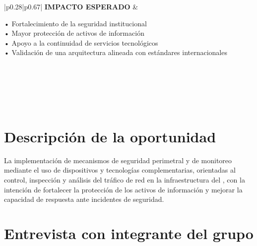 \begin{table}[H]
\begin{tabular}{|p{0.28\textwidth}|p{0.67\textwidth}|}
		\textbf{IMPACTO ESPERADO} &
		\begin{minipage}[t]{\linewidth}
			\vspace{2pt}
			• Fortalecimiento de la seguridad institucional \\ 
			• Mayor protección de activos de información \\ 
			• Apoyo a la continuidad de servicios tecnológicos \\ 
			• Validación de una arquitectura alineada con estándares internacionales
			\vspace{2pt}
		\end{minipage} \\ \hline
		
		  \\ \hline
		
		 \\ \hline
		
	\end{tabular}
\end{table}

\section{Descripción de la oportunidad}
\noindent

La implementación de mecanismos de seguridad perimetral y de monitoreo mediante el uso de dispositivos \UTM y tecnologías complementarias, 
orientadas al control, inspección y análisis del tráfico de red en la infraestructura del \GRID, con la intención de fortalecer la 
protección de los activos de información y mejorar la capacidad de respuesta ante incidentes de seguridad.


\section{Entrevista con integrante del grupo \GRID}

